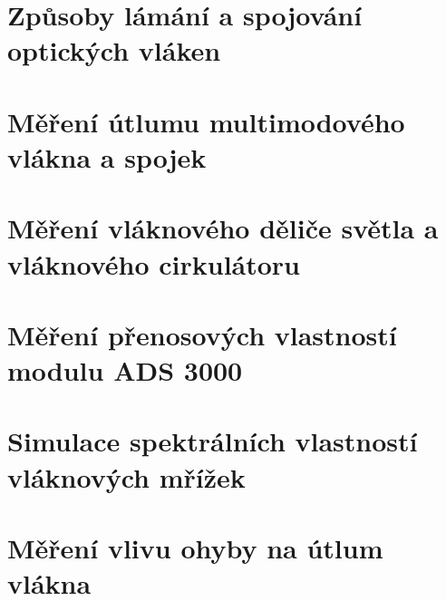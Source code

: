 \documentclass{protokol}
\begin{document}

\chapter{Způsoby lámání a spojování optických vláken}
  

\chapter{Měření útlumu multimodového vlákna a spojek}
  

\chapter{Měření vláknového děliče světla a vláknového cirkulátoru}
  

\chapter{Měření přenosových vlastností modulu ADS 3000}
  

\chapter{Simulace spektrálních vlastností vláknových mřížek }
  

\chapter{Měření vlivu ohyby na útlum vlákna}
  
\end{document}
